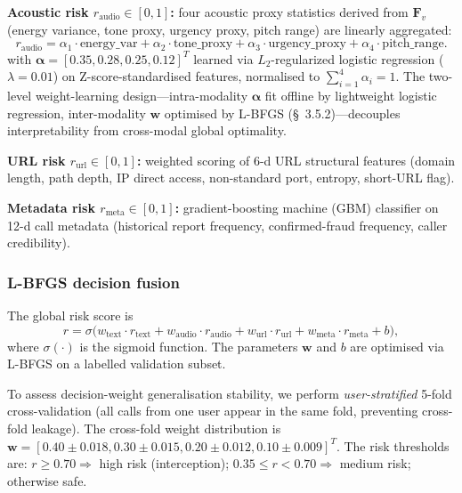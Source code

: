\documentclass[11pt, a4paper]{article}
\begin{document}
\textbf{Acoustic risk $r_{\mathrm{audio}}\in[0,1]$:} four acoustic proxy statistics derived from $\bm{F}_v$ (energy variance, tone proxy, urgency proxy, pitch range) are linearly aggregated:
\begin{equation}
r_{\mathrm{audio}} = \alpha_1\cdot\text{energy\_var} + \alpha_2\cdot\text{tone\_proxy} + \alpha_3\cdot\text{urgency\_proxy} + \alpha_4\cdot\text{pitch\_range}.
\end{equation}
with $\bm{\alpha} = [0.35, 0.28, 0.25, 0.12]^T$ learned via $L_2$-regularized logistic regression ($\lambda = 0.01$) on Z-score-standardised features, normalised to $\sum_{i=1}^4\alpha_i = 1$. The two-level weight-learning design---intra-modality $\bm{\alpha}$ fit offline by lightweight logistic regression, inter-modality $\mathbf{w}$ optimised by L-BFGS (\S~3.5.2)---decouples interpretability from cross-modal global optimality.

\textbf{URL risk $r_{\mathrm{url}}\in[0,1]$:} weighted scoring of 6-d URL structural features (domain length, path depth, IP direct access, non-standard port, entropy, short-URL flag).

\textbf{Metadata risk $r_{\mathrm{meta}}\in[0,1]$:} gradient-boosting machine (GBM) classifier on 12-d call metadata (historical report frequency, confirmed-fraud frequency, caller credibility).

\subsubsection{L-BFGS decision fusion}

The global risk score is
\begin{equation}
r = \sigma\bigl(w_{\mathrm{text}}\cdot r_{\mathrm{text}} + w_{\mathrm{audio}}\cdot r_{\mathrm{audio}} + w_{\mathrm{url}}\cdot r_{\mathrm{url}} + w_{\mathrm{meta}}\cdot r_{\mathrm{meta}} + b\bigr),
\end{equation}
where $\sigma(\cdot)$ is the sigmoid function. The parameters $\mathbf{w}$ and $b$ are optimised via L-BFGS on a labelled validation subset.

To assess decision-weight generalisation stability, we perform \emph{user-stratified} 5-fold cross-validation (all calls from one user appear in the same fold, preventing cross-fold leakage). The cross-fold weight distribution is $\mathbf{w} = [0.40 \pm 0.018, 0.30 \pm 0.015, 0.20 \pm 0.012, 0.10 \pm 0.009]^T$. The risk thresholds are: $r\ge 0.70 \Rightarrow$ high risk (interception); $0.35\le r < 0.70 \Rightarrow$ medium risk; otherwise safe.
\end{document}
